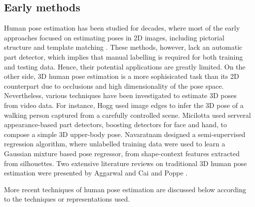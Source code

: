 \subsection{Early methods} 

Human pose estimation has been studied for decades, where most of the early approaches focused on estimating poses in 2D images, including pictorial structure \cite{Fischler1973} and template matching \cite{Ioffe1999}. These methods, however, lack an automatic part detector, which implies that manual labelling is required for both training and testing data. Hence, their potential applications are greatly limited.
On the other side, 3D human pose estimation is a more sophisicated task than its 2D counterpart due to occlusions and high dimensionality of the pose space. Nevertheless, various techniques have been investigated to estimate 3D poses from video data. For instance, Hogg \cite{Hogg1983} used image edges to infer the 3D pose of a walking person captured from a carefully controlled scene. 
Micilotta \etal \cite{Micilotta2006} used serveral appearance-based part detectors, \eg boosting detectors for face and hand, to compose a simple 3D upper-body pose. 
Navaratnam \etal \cite{Navaratnam2006} designed a semi-supervised regression algorithm, where unlabelled training data were used to learn a Gaussian mixture based pose regressor, from shape-context features extracted from silhouettes. Two extensive literature reviews on traditional 3D human pose estimation were presented by Aggarwal and Cai \cite{Aggarwal1999} and Poppe \cite{Poppe2007}. 

More recent techniques of human pose estimation are discussed below according to the techniques or representations used.

